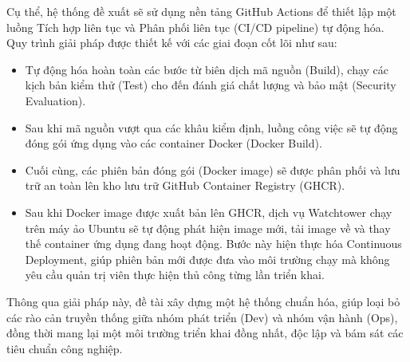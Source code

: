 \documentclass[12pt,a4paper,oneside]{extreport}
\begin{document}
Cụ thể, hệ thống đề xuất sẽ sử dụng nền tảng GitHub Actions để thiết lập một
luồng Tích hợp liên tục và Phân phối liên tục (CI/CD pipeline) tự động hóa. Quy
trình giải pháp được thiết kế với các giai đoạn cốt lõi như sau:
\begin{itemize}
  \item Tự động hóa hoàn toàn các bước từ biên dịch mã nguồn (Build), chạy các
  kịch bản kiểm thử (Test) cho đến đánh giá chất lượng và bảo mật (Security
  Evaluation).
  \item Sau khi mã nguồn vượt qua các khâu kiểm định, luồng công việc sẽ tự động
  đóng gói ứng dụng vào các container Docker (Docker Build).
  \item Cuối cùng, các phiên bản đóng gói (Docker image) sẽ được phân phối và lưu
  trữ an toàn lên kho lưu trữ GitHub Container Registry (GHCR).
  \item Sau khi Docker image được xuất bản lên GHCR, dịch vụ Watchtower chạy trên
  máy ảo Ubuntu sẽ tự động phát hiện image mới, tải image về và thay thế
  container ứng dụng đang hoạt động. Bước này hiện thực hóa Continuous
  Deployment, giúp phiên bản mới được đưa vào môi trường chạy mà không yêu cầu
  quản trị viên thực hiện thủ công từng lần triển khai.
\end{itemize}

Thông qua giải pháp này, đề tài xây dựng một hệ thống chuẩn hóa, giúp loại bỏ
các rào cản truyền thống giữa nhóm phát triển (Dev) và nhóm vận hành (Ops), đồng
thời mang lại một môi trường triển khai đồng nhất, độc lập và bám sát các tiêu
chuẩn công nghiệp.
\end{document}
